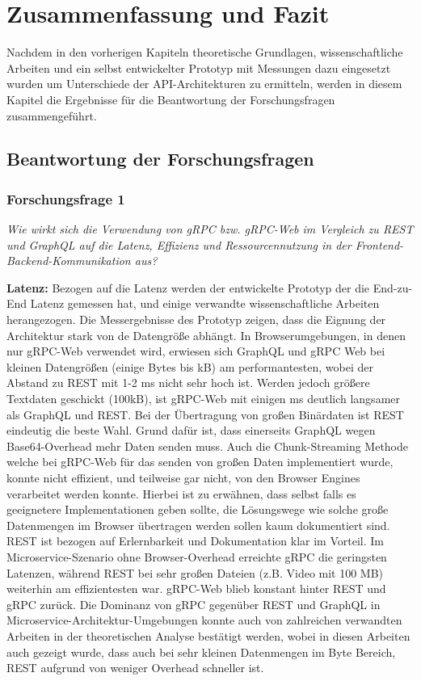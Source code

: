\chapter{Zusammenfassung und Fazit}
\label{chap:intro}
Nachdem in den vorherigen Kapiteln theoretische Grundlagen, wissenschaftliche Arbeiten und ein selbst entwickelter Prototyp mit Messungen dazu eingesetzt wurden  um Unterschiede der API-Architekturen zu ermitteln, werden in diesem Kapitel die Ergebnisse für die Beantwortung der Forschungsfragen zusammengeführt.
\chapterstart
\section{Beantwortung der Forschungsfragen}
\subsection*{Forschungsfrage 1}
\textit{Wie wirkt sich die Verwendung von gRPC bzw. gRPC-Web im Vergleich zu REST und GraphQL auf die Latenz, Effizienz und Ressourcennutzung in der Frontend-Backend-Kommunikation aus?}

\textbf{Latenz:} 
Bezogen auf die Latenz werden der entwickelte Prototyp der die End-zu-End Latenz gemessen hat, und einige verwandte wissenschaftliche Arbeiten herangezogen.
Die Messergebnisse des Prototyp zeigen, dass die Eignung der Architektur stark von de Datengröße abhängt. 
In Browserumgebungen, in denen nur gRPC-Web verwendet wird, erwiesen sich GraphQL und gRPC Web bei kleinen Datengrößen (einige Bytes bis kB) am performantesten, wobei der Abstand zu REST mit 1-2 ms nicht sehr hoch ist. 
Werden jedoch größere Textdaten geschickt (100kB), ist gRPC-Web mit einigen ms deutlich langsamer als GraphQL und REST. Bei der Übertragung von großen Binärdaten ist REST eindeutig die beste Wahl. Grund dafür ist, dass einerseits GraphQL wegen Base64-Overhead mehr Daten senden muss. Auch die Chunk-Streaming Methode welche bei gRPC-Web für das senden von großen Daten implementiert wurde, konnte nicht effizient, und teilweise gar nicht, von den Browser Engines verarbeitet werden konnte. Hierbei ist zu erwähnen, dass selbst falls es geeignetere Implementationen geben sollte, die Lösungswege wie solche große Datenmengen im Browser übertragen werden sollen kaum dokumentiert sind. REST ist bezogen auf Erlernbarkeit und Dokumentation klar im Vorteil.
Im Microservice-Szenario ohne Browser-Overhead erreichte gRPC die geringsten Latenzen, während REST bei sehr großen Dateien (z.B. Video mit 100 MB) weiterhin am effizientesten war. gRPC-Web blieb konstant hinter REST und gRPC zurück.
Die Dominanz von gRPC gegenüber REST und GraphQL in Microservice-Architektur-Umgebungen konnte auch von zahlreichen verwandten Arbeiten in der theoretischen Analyse bestätigt werden, wobei in diesen Arbeiten auch gezeigt wurde, dass auch bei sehr kleinen Datenmengen im Byte Bereich, REST aufgrund von weniger Overhead schneller ist.


